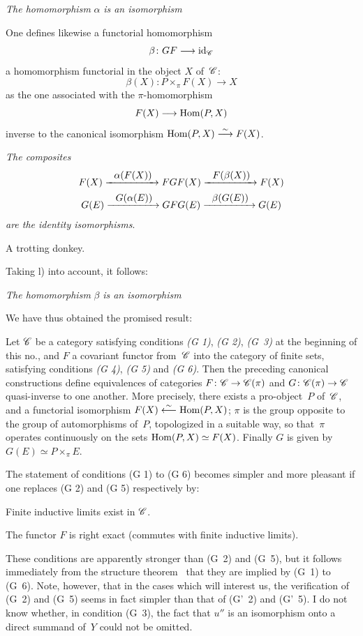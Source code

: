 \begin{enumerateb}
\item[l)] \emph{The homomorphism} $\alpha$ \emph{is an isomorphism}

One defines likewise a functorial homomorphism
$$
\beta \colon GF \to \id_{\cal{C}}
$$
\ie a homomorphism functorial in the object $X$ of~$\cal{C}$:
$$
\beta(X) \colon P \times_{\pi} F(X) \to X
$$
as
the one associated with the $\pi$-homomorphism
$$
F(X) \to \Hom(P,X)
$$
inverse to the canonical isomorphism $\operatorname{Hom}(P,X) \overset{\sim}{\longrightarrow} F(X)$.

\item[m)] \emph{The composites}
\begin{gather*}
F(X) \lto{\alpha(F(X))} FGF(X) \lto{F(\beta(X))} F(X)\\
G(E) \lto{G(\alpha(E))} GFG(E) \lto{\beta(G(E))} G(E)
\end{gather*}
\emph{are the identity isomorphisms}.

A trotting donkey.

Taking l) into account, it follows:

\item[n)] \emph{The homomorphism} $\beta$ \emph{is an isomorphism}

We have thus obtained the promised result:
\end{enumerateb}

\begin{theorem}
\label{V.4.1}
Let $\cal{C}$ be a category satisfying conditions \emph{(G
1)}, \emph{(G 2)}, \emph{(G~3)} at the beginning of this no., and $F$ a
covariant functor from~$\cal{C}$ into the category of finite
sets, satisfying conditions \emph{(G 4)}, \emph{(G 5)} and
\emph{(G 6)}. Then the preceding canonical constructions
define equivalences of categories $F\colon
\cal{C}\to \cal{C}(\pi)$ and $G\colon \cal{C}(\pi)\to \cal{C}$
quasi-inverse to one another. More precisely, there exists
a pro-object~$P$ of~$\cal{C}$, and a functorial isomorphism $F(X)
\overset{\sim}{\longleftarrow} \operatorname{Hom}(P, X)$; $\pi$ is the group opposite to the group of
automorphisms of~$P$, topologized in a suitable way,
so that~$\pi$ operates continuously on the
sets $\operatorname{Hom}(P, X)\simeq F(X)$. Finally $G$ is given by
$G(E)\simeq P\times_{\pi} E$.
\end{theorem}

\begin{remarks}
\label{V.4.2}
The statement of conditions (G 1) to (G 6) becomes simpler
and more pleasant if one replaces (G 2) and (G 5) respectively by:
\begin{enumerateb}
\item[(G' 2)] Finite inductive limits exist in
$\cal{C}$.
\item[(G' 5)] The functor $F$ is right exact (\ie commutes with
finite inductive limits).
\end{enumerateb}
These conditions are apparently stronger than (G~2) and (G~5), but
it follows immediately from the structure
theorem~ that they are implied by (G~1)
to (G~6). Note, however, that in the cases which will
interest us, the verification of (G~2) and (G~5) seems
in fact simpler than that of (G'~2) and (G'~5). I do not know whether,
in condition (G~3), the fact that $u''$ is an isomorphism onto a
direct summand of~$Y$ could not be omitted.
\end{remarks}
